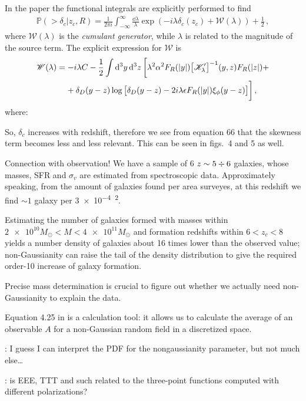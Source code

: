 \documentclass[main.tex]{subfiles}
\begin{document}
In the paper the functional integrals are explicitly performed to find 
%
\begin{align}
\mathbb{P}(> \delta _c | z_c, R) = \frac{1}{2 \pi i} \int_{- \infty }^{\infty } \frac{ \dd{\lambda }}{\lambda } \exp( - i \lambda \delta _c (z_c) + \mathscr{W}(\lambda )) + \frac{1}{2}
\,,
\end{align}
%
where \(\mathscr{W}(\lambda )\) is the \emph{cumulant generator}, while \(\lambda \) is related to the magnitude of the source term. The explicit expression for \(\mathscr{W}\) is 
%
\begin{align}
\begin{split}
\mathscr{W}(\lambda ) &=
- i \lambda C - \frac{1}{2} \int \dd[3]{y} \dd[3]{z} 
\bigg[
    \lambda^2 \alpha^2 F_R (\abs{y }) \qty[\mathscr{K}'_\lambda ]^{-1} (y, z)
    F_R(\abs{z}) + \\
    &\phantom{=}\ + \delta _D (y-z) 
    \log \qty[ \delta _D (y-z) - 2i \lambda \epsilon F_R (\abs{y}) \xi _\phi (y-z)]
\bigg]
\,,
\end{split}

\end{align}
%
where: 

So, \(\delta _c\) increases with redshift, therefore we see from equation 66 that the skewness term becomes less and less relevant. 
This can be seen in figs.\ 4 and 5 as well. 

Connection with observation! 
We have a sample of 6 \(z \sim 5 \divisionsymbol 6  \) galaxies, whose masses, SFR and \(\sigma _v\) are estimated from spectroscopic data.
Approximately speaking, from the amount of galaxies found per area surveyes, at this redshift we find \(\sim 1\) galaxy per \SI{3e-4}{\deg^2}. 

Estimating the number of galaxies formed with masses within \(\num{2e10} M_{\odot} < M < \num{4e11}M_{\odot}\) and formation redshifts within \(6 < z_c < 8\) yields a number density of galaxies about 16 times lower than the observed value; non-Gaussianity can raise the tail of the density distribution to give the required order-10 increase of galaxy formation. 

Precise mass determination is crucial to figure out whether we actually need non-Gaussianity to explain the data. 

Equation 4.25 in \textcite[]{verdeMultivariateJointPDF2013} is a calculation tool: it allows us to calculate the average of an observable \(A\) for a non-Gaussian random field in a discretized space. 

\textcite[]{planckcollaborationPlanck2018Results2019}: I guess I can interpret the PDF for the nongaussianity parameter, but not much else\dots

\textcite[]{celoriaPrimordialNonGaussianity2018}: is EEE, TTT and such related to the three-point functions computed with different polarizations?
\end{document}

